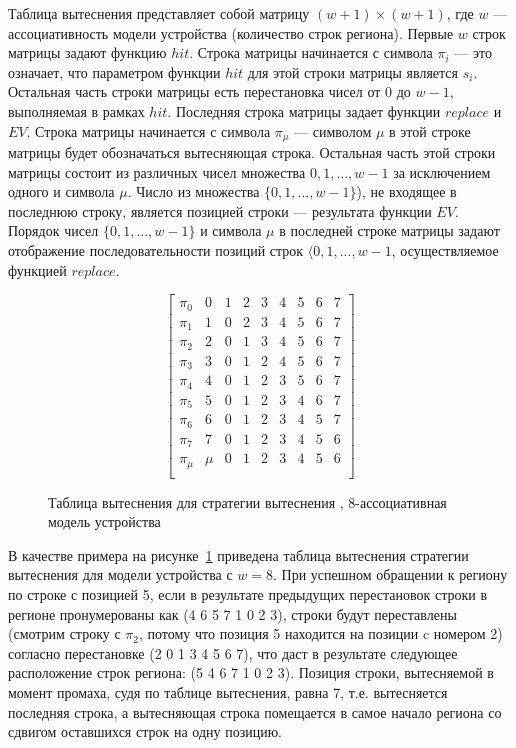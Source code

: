 Таблица вытеснения представляет собой матрицу $(w{+}1) \times (w{+}1)$, где $w$ --- ассоциативность модели устройства (количество строк региона). Первые $w$ строк матрицы задают функцию $hit$. Строка матрицы начинается с символа $\pi_i$ --- это означает, что параметром функции $hit$ для этой строки матрицы является $s_i$. Остальная часть строки матрицы есть перестановка чисел от 0 до $w{-}1$, выполняемая в рамках $hit$. Последняя строка матрицы задает функции $replace$ и $EV$. Строка матрицы начинается с символа $\pi_{\mu}$ --- символом $\mu$ в этой строке матрицы будет обозначаться вытесняющая строка. Остальная часть этой строки матрицы состоит из различных чисел множества $0, 1, ..., w{-}1$ за исключением одного и символа $\mu$. Число из множества $\{0, 1, ..., w{-}1\}$), не входящее в последнюю строку, является позицией строки --- результата функции $EV$. Порядок чисел $\{0, 1, ..., w{-}1\}$ и символа $\mu$ в последней строке матрицы задают отображение последовательности позиций строк $\langle 0, 1, ..., w{-}1$, осуществляемое функцией $replace$.

\begin{figure}[h]
$$ \left[
     \begin{array}{c|cccccccc}
       \pi_0 & 0 & 1 & 2 & 3 & 4 & 5 & 6 & 7 \\
       \pi_1 & 1 & 0 & 2 & 3 & 4 & 5 & 6 & 7 \\
       \pi_2 & 2 & 0 & 1 & 3 & 4 & 5 & 6 & 7 \\
       \pi_3 & 3 & 0 & 1 & 2 & 4 & 5 & 6 & 7 \\
       \pi_4 & 4 & 0 & 1 & 2 & 3 & 5 & 6 & 7 \\
       \pi_5 & 5 & 0 & 1 & 2 & 3 & 4 & 6 & 7 \\
       \pi_6 & 6 & 0 & 1 & 2 & 3 & 4 & 5 & 7 \\
       \pi_7 & 7 & 0 & 1 & 2 & 3 & 4 & 5 & 6 \\
       \pi_{\mu} & \mu & 0 & 1 & 2 & 3 & 4 & 5 & 6 \\
     \end{array}
   \right]
$$
\caption{Таблица вытеснения для стратегии вытеснения \LRU,
8-ассоциативная модель устройства}\label{fig:PolicyTableLRU8}
\end{figure}

В качестве примера на рисунке~\ref{fig:PolicyTableLRU8} приведена таблица вытеснения стратегии вытеснения \LRU для модели устройства с $w = 8$. При успешном обращении к региону по строке с позицией 5, если в результате предыдущих перестановок строки в регионе пронумерованы как (4 6 5 7 1 0 2 3), строки будут переставлены
(смотрим строку с $\pi_2$, потому что позиция 5 находится на позиции c номером 2) согласно перестановке (2 0 1 3 4 5 6 7), что даст в результате следующее расположение строк региона: (5 4 6 7 1 0 2 3). Позиция строки, вытесняемой в момент промаха, судя по таблице вытеснения, равна 7, т.е. вытесняется последняя строка, а вытесняющая строка помещается в самое начало региона со сдвигом оставшихся строк на одну позицию.

